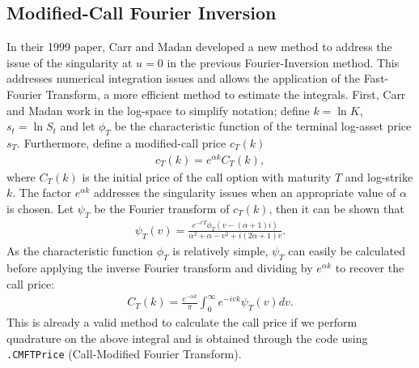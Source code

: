 \documentclass[11pt]{article}
\begin{document}
		\subsection{Modified-Call Fourier Inversion}
		In their 1999 paper, Carr and Madan developed a new method to address the issue of the singularity at \( u = 0 \) in the previous Fourier-Inversion method. This addresses numerical integration issues and allows the application of the Fast-Fourier Transform, a more efficient method to estimate the integrals. First, Carr and Madan work in the log-space to simplify notation; define \( k = \ln K \), \( s_t = \ln S_t \) and let \( \phi_T \) be the characteristic function of the terminal log-asset price \( s_T \). Furthermore, define a modified-call price \( c_T(k) \)
		\begin{align*}
			c_T(k) = e^{\alpha k}C_{T}(k),
		\end{align*}
		where \( C_{T}(k) \) is the initial price of the call option with maturity \( T \) and log-strike \( k \). The factor \( e^{\alpha k} \) addresses the singularity issues when an appropriate value of \( \alpha \) is chosen. Let \( \psi_{T} \) be the Fourier transform of \( c_{T}(k) \), then it can be shown that
		\begin{align*}
			\psi_{T}(v) = \frac{e^{-rT}\phi_{T}(v - (\alpha + 1)i)}{\alpha^{2} + \alpha - v^2 + i(2\alpha + 1)v}.
		\end{align*}
		As the characteristic function \( \phi_T \) is relatively simple, \( \psi_T \) can easily be calculated before applying the inverse Fourier transform and dividing by \( e^{\alpha k} \) to recover the call price:
		\begin{align*}
			C_{T}(k) = \frac{e^{-\alpha k}}{\pi}\int_{0}^{\infty}e^{-ivk}\psi_{T}(v)dv.
		\end{align*}
		This is already a valid method to calculate the call price if we perform quadrature on the above integral and is obtained through the code using \colorbox{gray!25}{\texttt{.CMFTPrice}} (Call-Modified Fourier Transform). 
\end{document}
